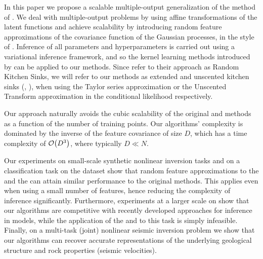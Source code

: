 In this paper we propose a scalable multiple-output generalization  of the
method of \citet{steinberg-bonilla-nips-2014}. We deal with multiple-output
problems by using affine transformations of the latent functions and achieve
scalability by introducing random feature approximations of the covariance
function of the Gaussian processes, in the style of
\citet{rahimi-recht-nips-2007}. Inference of all parameters and hyperparameters
is carried out using a variational inference framework, and so the kernel
learning methods introduced by \citet{yang-et-al-aistats-2015} can be
applied to our methods. Since \citet{rahimi-recht-nips-2007} refer to their
approach as Random Kitchen Sinks, we will refer to our methods as extended and
unscented kitchen sinks (\eks, \uks), when using the Taylor series
approximation or the Unscented Transform approximation in the conditional
likelihood respectively. 

Our approach naturally avoids the cubic scalability of the original \egp and
\ugp methods \citep{steinberg-bonilla-nips-2014} as a function of the number of
training points. Our algorithms' complexity is dominated by the inverse of the
feature covariance of size $D$, which has a time complexity of $\mathcal{O}\!\left({{D^3}}\right)$,
where typically $D \ll N$. 

Our experiments on small-scale synthetic nonlinear inversion tasks and on a
classification task on the \usps dataset show that random feature
approximations to the \egp and the \ugp can attain similar performance to the
original methods. This applies even when using a small number of features,
hence reducing the complexity of inference significantly. Furthermore,
experiments at a larger scale on  \mnist  show that our algorithms
are competitive with recently developed approaches for inference in \gp models,
while the application of the \egp and \ugp to this task is simply infeasible.
Finally, on a multi-task (joint) nonlinear seismic inversion  problem we show
that our algorithms can recover accurate representations of the underlying
geological structure and rock properties (seismic velocities).










